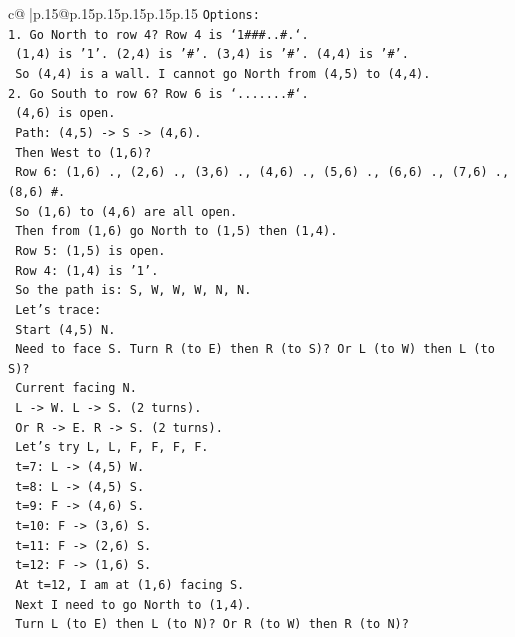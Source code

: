 \documentclass{article}
\begin{document}
{\begin{supertabular}{c@{$\;$}|p{.15\linewidth}@{}p{.15\linewidth}p{.15\linewidth}p{.15\linewidth}p{.15\linewidth}p{.15\linewidth}}
{{{\texttt{Options:} \\
\texttt{1. Go North to row 4? Row 4 is `1\#\#\#..\#.`.} \\
\texttt{   (1,4) is '1'. (2,4) is '\#'. (3,4) is '\#'. (4,4) is '\#'.} \\
\texttt{   So (4,4) is a wall. I cannot go North from (4,5) to (4,4).} \\
\texttt{2. Go South to row 6? Row 6 is `.......\#`.} \\
\texttt{   (4,6) is open.} \\
\texttt{   Path: (4,5) {-}> S {-}> (4,6).} \\
\texttt{   Then West to (1,6)?} \\
\texttt{   Row 6: (1,6) ., (2,6) ., (3,6) ., (4,6) ., (5,6) ., (6,6) ., (7,6) ., (8,6) \#.} \\
\texttt{   So (1,6) to (4,6) are all open.} \\
\texttt{   Then from (1,6) go North to (1,5) then (1,4).} \\
\texttt{   Row 5: (1,5) is open.} \\
\texttt{   Row 4: (1,4) is '1'.} \\
\texttt{   So the path is: S, W, W, W, N, N.} \\
\texttt{   Let's trace:} \\
\texttt{   Start (4,5) N.} \\
\texttt{   Need to face S. Turn R (to E) then R (to S)? Or L (to W) then L (to S)?} \\
\texttt{   Current facing N.} \\
\texttt{   L {-}> W. L {-}> S. (2 turns).} \\
\texttt{   Or R {-}> E. R {-}> S. (2 turns).} \\
\texttt{   Let's try L, L, F, F, F, F.} \\
\texttt{   t=7: L {-}> (4,5) W.} \\
\texttt{   t=8: L {-}> (4,5) S.} \\
\texttt{   t=9: F {-}> (4,6) S.} \\
\texttt{   t=10: F {-}> (3,6) S.} \\
\texttt{   t=11: F {-}> (2,6) S.} \\
\texttt{   t=12: F {-}> (1,6) S.} \\
\texttt{   At t=12, I am at (1,6) facing S.} \\
\texttt{   Next I need to go North to (1,4).} \\
\texttt{   Turn L (to E) then L (to N)? Or R (to W) then R (to N)?} \\
}}}
\end{supertabular}}
\end{document}
